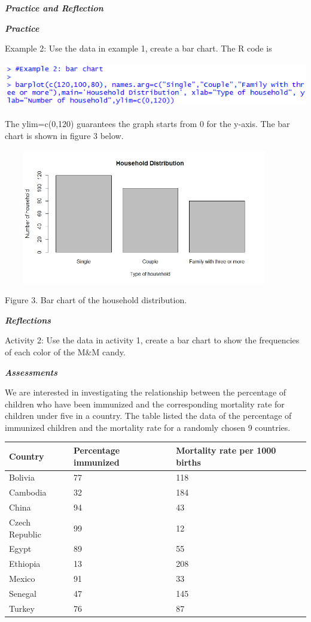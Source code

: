 \emph{\textbf{Practice and Reflection}}

\emph{\textbf{Practice}}

Example 2: Use the data in example 1, create a bar chart. The R code is

\includegraphics[width=5.98958in,height=0.77083in]{media/image4.png}

The ylim=c(0,120) guarantees the graph starts from 0 for the y-axis. The
bar chart is shown in figure 3 below.

\includegraphics[width=4.85386in,height=2.3125in]{media/image5.jpeg}

Figure 3. Bar chart of the household distribution.

\emph{\textbf{Reflections}}

Activity 2: Use the data in activity 1, create a bar chart to show the
frequencies of each color of the M\&M candy.

\emph{\textbf{Assessments}}

We are interested in investigating the relationship between the
percentage of children who have been immunized and the corresponding
mortality rate for children under five in a country. The table listed
the data of the percentage of immunized children and the mortality rate
for a randomly chosen 9 countries.

\begin{longtable}[]{@{}lll@{}}
\toprule
Country & Percentage immunized & Mortality rate per 1000
births\tabularnewline
\midrule
\endhead
Bolivia & 77 & 118\tabularnewline
Cambodia & 32 & 184\tabularnewline
China & 94 & 43\tabularnewline
Czech Republic & 99 & 12\tabularnewline
Egypt & 89 & 55\tabularnewline
Ethiopia & 13 & 208\tabularnewline
Mexico & 91 & 33\tabularnewline
Senegal & 47 & 145\tabularnewline
Turkey & 76 & 87\tabularnewline
\bottomrule
\end{longtable}

